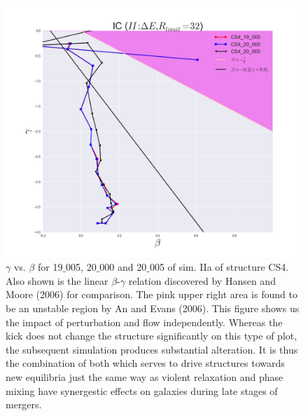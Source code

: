 \begin{figure}[!htbp]
\centering
\includegraphics[width=1.0\linewidth]{img/beta_vs_gamma_CS4_Time_evolution_Rlimit32.png}
\caption{$\gamma$ vs. $\beta$ for 19$\_$005, 20$\_$000 and 20$\_$005 of sim. IIa of structure CS4.
Also shown is the linear $\beta$-$\gamma$ relation discovered by Hansen and Moore (2006) for comparison. The pink upper right area is found to be an unstable region by An and Evans (2006). This figure shows us the impact of perturbation and flow independently. Whereas the kick does not change the structure significantly on this type of plot, the subsequent simulation produces substantial alteration. It is thus the combination of both which serves to drive structures towards new equilibria just the same way as violent relaxation and phase mixing have synergestic effects on galaxies during late stages of mergers.}
\label{fig:test}
\end{figure}

